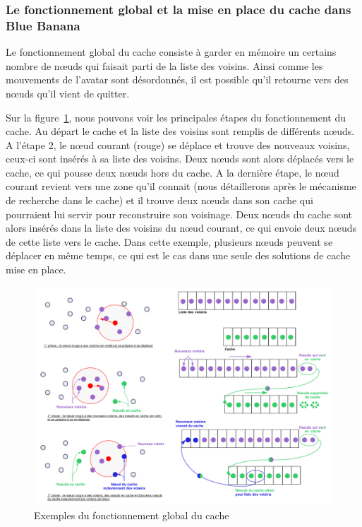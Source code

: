 \subsubsection{Le fonctionnement global et la mise en place du cache dans Blue Banana}
Le fonctionnement global du cache consiste à garder en mémoire un certains nombre de nœuds qui faisait parti de la liste des voisins. Ainsi comme les mouvements de l'avatar sont désordonnés, il est possible qu'il retourne vers des nœuds qu'il vient de quitter. 
\par Sur la figure~\ref{cacheW}, nous pouvons voir les principales étapes du fonctionnement du cache. Au départ le cache et la liste des voisins sont remplis de différents nœuds. A l'étape 2, le nœud courant (rouge) se déplace et trouve des nouveaux voisins, ceux-ci sont insérés à sa liste des voisins. Deux nœuds sont alors déplacés vers le cache, ce qui pousse deux nœuds hors du cache. A la dernière étape, le nœud courant revient vers une zone qu'il connait (nous détaillerons après le mécanisme de recherche dans le cache) et il trouve deux nœuds dans son cache qui pourraient lui servir pour reconstruire son voisinage. Deux nœuds du cache sont alors insérés dans la liste des voisins du nœud courant, ce qui envoie deux nœuds de cette liste vers le cache. Dans cette exemple, plusieurs nœuds peuvent se déplacer en même temps, ce qui est le cas dans une seule des solutions de cache mise en place.
	\begin{figure}[!h]
        \centering
        \includegraphics[scale=0.35]{./Ressources/Images/cacheWextends.png}
        \caption{Exemples du fonctionnement global du cache}
        \label{cacheW}
        \end{figure} 
